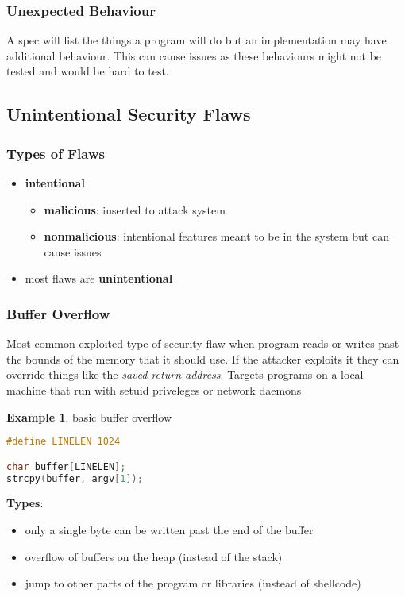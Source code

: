 \documentclass[]{article}
\theoremstyle{definition}
\newtheorem{ex}{Example}[section]
\begin{document}
	\subsubsection{Unexpected Behaviour}
	A spec will list the things a program will do but an implementation may have additional behaviour. 
	This can cause issues as these behaviours might not be tested and would be hard to test.

	\subsection{Unintentional Security Flaws}
	\subsubsection{Types of Flaws}
	\begin{itemize}
		\item \textbf{intentional}
			\begin{itemize}
				\item \textbf{malicious}: inserted to attack system
				\item \textbf{nonmalicious}: intentional features meant to be in the system but can cause issues
			\end{itemize}
		\item most flaws are \textbf{unintentional}
	\end{itemize}
	\subsubsection{Buffer Overflow}
	Most common exploited type of security flaw when program reads or writes past the bounds of the memory that it should use. If the attacker exploits it they can override things like the \textit{saved return address}. Targets programs on a local machine that run with setuid priveleges or network daemons
	
	\begin{ex}
		basic buffer overflow
	\begin{lstlisting}[language=C]
#define LINELEN 1024

char buffer[LINELEN];
strcpy(buffer, argv[1]);
	\end{lstlisting}
	\end{ex}
	
	\textbf{Types}:
	\begin{itemize}
		\item only a single byte can be written past the end of the buffer
		\item overflow of buffers on the heap (instead of the stack)
		\item jump to other parts of the program or libraries (instead of shellcode)
	\end{itemize}
\end{document}
